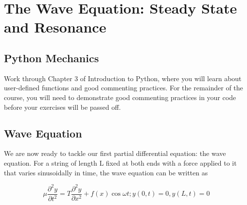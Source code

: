 
\chapter*{The Wave Equation: Steady State and Resonance}
\section*{Python Mechanics}
\begin{problem} \label{P3.1}
 Work through Chapter 3 of Introduction to Python, where you will learn
about user-defined functions and good commenting practices. For the
remainder of the course, you will need to demonstrate good commenting
practices in your code before your exercises will be passed off.
\end{problem}
\section*{Wave Equation}

We are now ready to tackle our first partial differential equation: the wave equation. For a string of length L fixed at both ends with a force applied to it that varies
sinusoidally in time, the wave equation can be written as


\begin{equation}\label{eq:31}
		\mu \frac{\partial^2 y}{\partial t^2} = T \frac{\partial^2y}{\partial x^2} + f(x) \cos \omega t ; y(0,t) = 0, y(L,t) = 0
				\end{equation}
				
